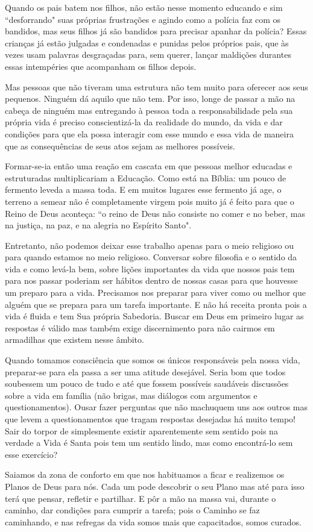 \emdash{}Quando os pais batem nos filhos, não estão nesse momento educando e sim ``desforrando" suas próprias frustrações e agindo como a polícia faz com os bandidos, mas seus filhos já são bandidos para precisar apanhar da polícia? Essas crianças já estão julgadas e condenadas e punidas pelos próprios pais, que às vezes usam palavras desgraçadas para, sem querer, lançar maldições durantes essas intempéries que acompanham os filhos depois.

\emdash{}Mas pessoas que não tiveram uma estrutura não tem muito para oferecer aos seus pequenos. Ninguém dá aquilo que não tem. Por isso, longe de passar a mão na cabeça de ninguém mas entregando à pessoa toda a responsabilidade pela sua própria vida é preciso conscientizá-la da realidade do mundo, da vida e dar condições para que ela possa interagir com esse mundo e essa vida de maneira que as consequências de seus atos sejam as melhores possíveis.

\emdash{}Formar-se-ia então uma reação em cascata em que pessoas melhor educadas e estruturadas multiplicariam a Educação. Como está na Bíblia: um pouco de fermento leveda a massa toda. E em muitos lugares esse fermento já age, o terreno a semear não é completamente virgem pois muito já é feito para que o Reino de Deus aconteça: ``o reino de Deus não consiste no comer e no beber, mas na justiça, na paz, e na alegria no Espírito Santo".

\emdash{}Entretanto, não podemos deixar esse trabalho apenas para o meio religioso ou para quando estamos no meio religioso. Conversar sobre filosofia e o sentido da vida e como levá-la bem, sobre lições importantes da vida que nossos pais tem para nos passar poderiam ser hábitos dentro de nossas casas para que houvesse um  preparo para a vida. Precisamos nos preparar para viver como ou melhor que alguém que se prepara para um tarefa importante. E não há receita pronta pois a vida é fluida e tem Sua própria Sabedoria. Buscar em Deus em primeiro lugar as respostas é válido mas também exige discernimento para não cairmos em armadilhas que existem nesse âmbito. 

\emdash{}Quando tomamos consciência que somos os únicos responsáveis pela nossa vida, preparar-se para ela passa a ser uma atitude desejável. Seria bom que todos soubessem um pouco de tudo e até que fossem possíveis saudáveis discussões sobre a vida em família (não brigas, mas diálogos com argumentos e questionamentos). Ousar fazer perguntas que não machuquem uns aos outros mas que levem a questionamentos que tragam respostas desejadas há muito tempo! Sair do torpor de simplesmente existir aparentemente sem sentido pois na verdade a Vida é Santa pois tem um sentido lindo, mas como encontrá-lo sem esse exercício?

\emdash{}Saiamos da zona de conforto em que nos habituamos a ficar e realizemos os Planos de Deus para nós. Cada um pode descobrir o seu Plano mas até para isso terá que pensar, refletir e partilhar. E pôr a mão na massa vai, durante o caminho, dar condições para cumprir a tarefa; pois o Caminho se faz caminhando, e nas refregas da vida somos mais que capacitados, somos curados.